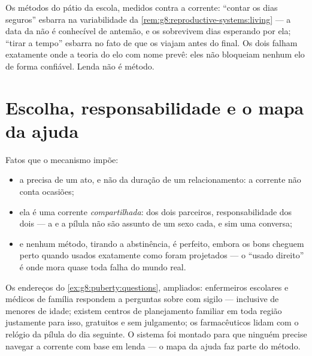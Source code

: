 \begin{remark}\label{rem:g8:contraception:notwork}
Os métodos do pátio da escola, medidos contra a corrente: ``contar os
dias seguros'' esbarra na variabilidade da
\cref{rem:g8:reproductive-systems:living} --- a data da  não é
conhecível de antemão, e os  sobrevivem dias esperando
por ela; ``tirar a tempo'' esbarra no fato de que os 
viajam antes do final. Os dois falham exatamente onde a teoria do elo
com nome prevê: eles não bloqueiam nenhum elo de forma confiável.
Lenda não é método.
\end{remark}

\section{Escolha, responsabilidade e o mapa da ajuda}

\begin{proposition}\label{prop:g8:contraception:choice}
Fatos que o mecanismo impõe:
\begin{itemize}
  \item a  precisa de um ato, e não da duração de um
        relacionamento: a corrente não conta ocasiões;
  \item ela é uma corrente \emph{compartilhada}:  dos dois
        parceiros, responsabilidade dos dois --- a  e a
        pílula não são assunto de um sexo cada, e sim uma conversa;
  \item e nenhum método, tirando a abstinência, é perfeito, embora os
        bons cheguem perto quando usados exatamente como foram
        projetados --- o ``usado direito'' é onde mora quase toda
        falha do mundo real.
\end{itemize}
\end{proposition}
\admitted

\begin{example}\label{ex:g8:contraception:help}
Os endereços do \cref{ex:g8:puberty:questions}, ampliados: enfermeiros
escolares e médicos de família respondem a perguntas sobre
 com sigilo --- inclusive de menores de idade; existem
centros de planejamento familiar em toda região justamente para isso,
gratuitos e sem julgamento; os farmacêuticos lidam com o relógio da
pílula do dia seguinte. O sistema foi montado para que ninguém precise
navegar a corrente com base em lenda --- o mapa da ajuda faz parte do
método.
\end{example}

